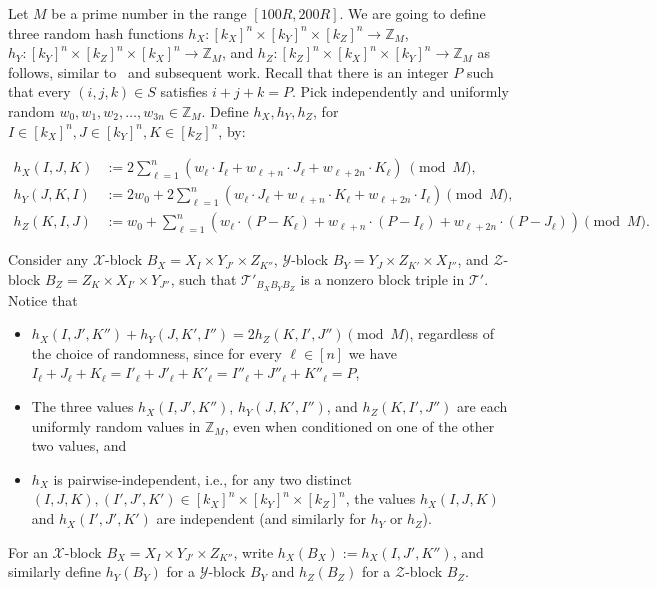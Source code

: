 \documentclass{theoretics}
\newcommand{\T}{\mathcal{T}}
\newcommand{\X}{\mathcal{X}}
\newcommand{\Y}{\mathcal{Y}}
\newcommand{\Z}{\mathcal{Z}}
\begin{document}
Let $M$ be a prime number in the range $[100R,200R]$. We are going to define three random hash functions $h_X : [k_X]^n \times [k_Y]^n \times [k_Z]^n \to \mathbb{Z}_M$, $h_Y : [k_Y]^n \times [k_Z]^n \times [k_X]^n \to \mathbb{Z}_M$, and $h_Z : [k_Z]^n \times [k_X]^n \times [k_Y]^n \to \mathbb{Z}_M$ as follows, similar to~\cite{strassenlaser1,coppersmith} and subsequent work.
Recall that there is an integer $P$ such that every $(i,j,k) \in S$ satisfies $i+j+k=P$.
Pick independently and uniformly random $w_0, w_1, w_2, \ldots, w_{3n} \in \mathbb{Z}_M$. Define $h_X, h_Y, h_Z$, for $I \in [k_X]^n,J \in [k_Y]^n, K \in [k_Z]^n$, by:

\begin{align*} h_X (I,J,K) &:= 2\sum_{\ell=1}^n (w_\ell \cdot I_\ell + w_{\ell+n} \cdot J_\ell + w_{\ell+2n} \cdot K_\ell) \ \pmod{M},\\
 h_Y (J,K,I) &:= 2w_0 + 2\sum_{\ell=1}^n (w_\ell \cdot J_\ell + w_{\ell+n} \cdot K_\ell + w_{\ell+2n} \cdot I_\ell) \pmod{M},\\
 h_Z (K,I,J) &:= w_0 + \sum_{\ell=1}^n (w_\ell \cdot (P - K_\ell) + w_{\ell+n} \cdot (P-I_\ell) + w_{\ell+2n} \cdot (P-J_\ell)) \pmod{M}.\end{align*}

Consider any $\X$-block $B_X = X_I \times Y_{J'} \times Z_{K''}$, $\Y$-block $B_Y = Y_{J} \times Z_{K'} \times X_{I''}$, and $\Z$-block $B_Z = Z_{K} \times X_{I'} \times Y_{J''}$, such that $\T'_{B_X B_Y B_Z}$ is a nonzero block triple in $\T'$. Notice that
\begin{itemize}
    \item $h_X(I,J',K'') + h_Y(J,K',I'') = 2h_Z(K,I',J'') \pmod{M}$, regardless of the choice of randomness, since for every $\ell \in [n]$ we have $I_\ell+J_\ell+K_\ell = I'_\ell+J'_\ell+K'_\ell = I''_\ell+J''_\ell+K''_\ell = P$,
    \item The three values $h_X(I,J',K'')$, $h_Y(J,K',I'')$, and $h_Z(K,I',J'')$ are each uniformly random values in $\mathbb{Z}_M$, even when conditioned on one of the other two values, and 
    \item $h_X$ is pairwise-independent, i.e., for any two distinct $(I,J,K), (I',J',K') \in [k_X]^n \times [k_Y]^n \times [k_Z]^n$, the values $h_X(I,J,K)$ and $h_X(I',J',K')$ are independent (and similarly for $h_Y$ or $h_Z$).
\end{itemize}
For an $\X$-block $B_X = X_I \times Y_{J'} \times Z_{K''}$, write $h_X(B_X) := h_X(I,J',K'')$, and similarly define $h_Y(B_Y)$ for a $\Y$-block $B_Y$ and $h_Z(B_Z)$ for a $\Z$-block $B_Z$.
\end{document}
